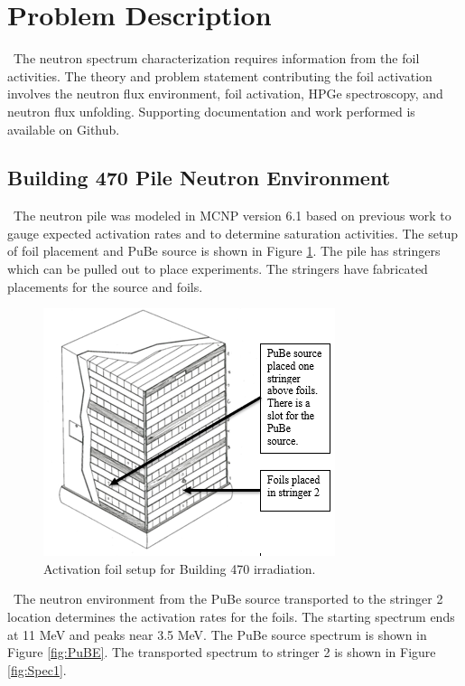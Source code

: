 \documentclass[journal]{IEEEtran}
\let\MYoriglatexcaption\caption
\renewcommand{\caption}[2][\relax]{\MYoriglatexcaption[#2]{#2}}
\begin{document}
	\section{Problem Description}
	
    \ The neutron spectrum characterization requires information from the foil activities. 
The theory and problem statement contributing the foil activation involves the neutron flux environment, foil activation, HPGe spectroscopy, and neutron flux unfolding. 
Supporting documentation and work performed is available on Github\cite{Me}. 
	
	\subsection{Building 470 Pile Neutron Environment }
	\ The neutron pile was modeled in MCNP version 6.1 based on previous work to gauge expected activation rates and to determine saturation activities\cite{Will}. 
The setup of foil placement and PuBe source is shown in Figure \ref{fig:pile}. 
The pile has stringers which can be pulled out to place experiments.
The stringers have fabricated placements for the source and foils. 
	
	\begin{figure}[h!]
		\includegraphics[width=\linewidth]{Figures/PileSetup.png}
		\caption{Activation foil setup for Building 470 irradiation.}
		\label{fig:pile}
	\end{figure}

	\ The neutron environment from the PuBe source transported to the stringer 2 location determines the activation rates for the foils. 
The starting spectrum ends at 11 MeV and peaks near 3.5 MeV. 
The PuBe source spectrum is shown in Figure \ref{fig:PuBE}. 
The transported spectrum to stringer 2 is shown in Figure \ref{fig:Spec1}. 
	
\end{document}
